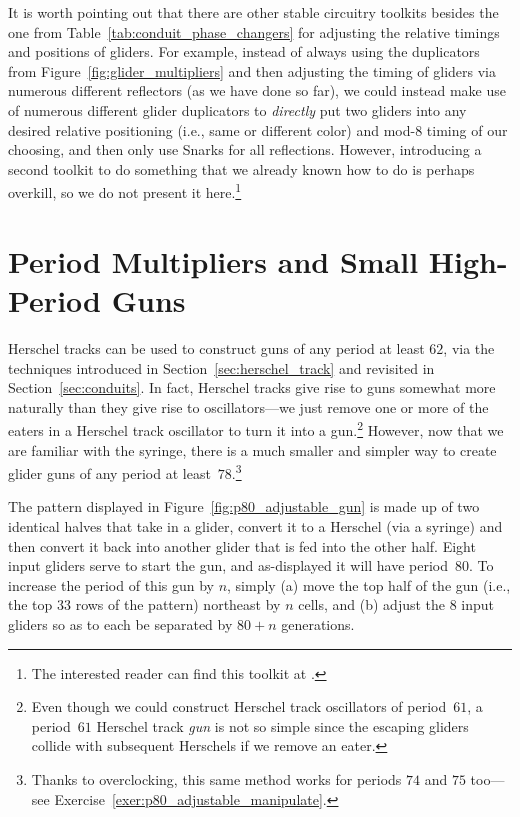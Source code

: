 It is worth pointing out that there are other stable circuitry toolkits besides the one from Table~\ref{tab:conduit_phase_changers} for adjusting the relative timings and positions of gliders. For example, instead of always using the duplicators from Figure~\ref{fig:glider_multipliers} and then adjusting the timing of gliders via numerous different reflectors (as we have done so far), we could instead make use of numerous different glider duplicators to \emph{directly} put two gliders into any desired relative positioning (i.e., same or different color) and mod-$8$ timing of our choosing, and then only use Snarks for all reflections. However, introducing a second toolkit to do something that we already known how to do is perhaps overkill, so we do not present it here.\footnote{The interested reader can find this toolkit at .}



\section{Period Multipliers and Small High-Period Guns}\label{sec:large_glider_guns}

Herschel tracks can be used to construct guns of any period at least $62$, via the techniques introduced in Section~\ref{sec:herschel_track} and revisited in Section~\ref{sec:conduits}. In fact, Herschel tracks give rise to guns somewhat more naturally than they give rise to oscillators---we just remove one or more of the eaters in a Herschel track oscillator to turn it into a gun.\footnote{Even though we could construct Herschel track oscillators of period~$61$, a period~$61$ Herschel track \emph{gun} is not so simple since the escaping gliders collide with subsequent Herschels if we remove an eater.} However, now that we are familiar with the syringe, there is a much smaller and simpler way to create glider guns of any period at least~$78$.\footnote{Thanks to overclocking, this same method works for periods $74$ and $75$ too---see Exercise~\ref{exer:p80_adjustable_manipulate}.}

The pattern displayed in Figure~\ref{fig:p80_adjustable_gun} is made up of two identical halves that take in a glider, convert it to a Herschel (via a syringe) and then convert it back into another glider that is fed into the other half. Eight input gliders serve to start the gun, and as-displayed it will have period~$80$. To increase the period of this gun by $n$, simply (a) move the top half of the gun (i.e., the top $33$ rows of the pattern) northeast by $n$ cells, and (b) adjust the $8$ input gliders so as to each be separated by $80+n$ generations.

